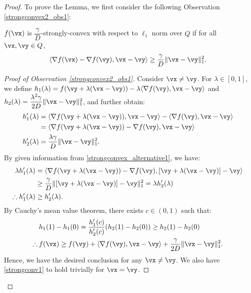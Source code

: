 \begin{proof}
    To prove the Lemma, we first consider the following
    Observation \ref{strongconvex2_obs1}:
    \begin{observation}
    \label{strongconvex2_obs1}
        $f(\vx)$ is $\dfrac{\gamma}{D}$-strongly-convex with respect to $\ell_1$ norm over $Q$ if for all $\vx,\vy \in Q$,
        \begin{align}
        \label{strongconvex_alternative1}
            \langle \nabla f(\vx) - \nabla f(\vy), \vx-\vy \rangle \geq \frac{\gamma}{D} \|\vx-\vy \|_1^2.
        \end{align}
    \end{observation}
    \begin{proof}[Proof of Observation \ref{strongconvex2_obs1}]
            Consider $\vx \neq \vy$. For $\lambda \in [0, 1]$, we define  $h_1(\lambda)= f(\vy+\lambda(\vx-\vy)) - \lambda \langle \nabla f(\vy) , \vx-\vy \rangle$ and $h_2(\lambda) = \dfrac{\lambda^2 \gamma}{2D} \|\vx-\vy \|_1^2$, and further obtain:
    \begin{align*}
        h_1'(\lambda) &=  \langle \nabla f(\vy+\lambda(\vx-\vy)) , \vx-\vy \rangle-  \langle \nabla f(\vy), \vx-\vy \rangle \\
        &= \langle \nabla f(\vy+\lambda(\vx-\vy)) - \nabla f(\vy)  , \vx-\vy \rangle \\
        h_2'(\lambda) &= \frac{\lambda \gamma}{D} \|\vx-\vy\|_1^2. 
    \end{align*} 
    By given information from \eqref{strongconvex_alternative1}, we have:
    \begin{align*}
        \lambda h_1'(\lambda)&= \langle \nabla f(\vy+\lambda(\vx-\vy)) - \nabla f(\vy)  , [\vy+\lambda (\vx-\vy)] - \vy \rangle \\
        &\geq \frac{\gamma}{D} \| [\vy+\lambda (\vx-\vy)] - \vy \|_1^2 = \lambda h_2'(\lambda)  \\
        \therefore h_1'(\lambda) &\geq h_2'(\lambda).
    \end{align*}
By Cauchy's mean value theorem, there exists $c\in (0,1)$ such that: 
\begin{align}
    &h_1(1) - h_1(0) = \frac{h_1'(c)}{h_2'(c)}
    (h_2(1) - h_2(0)) \geq h_2(1) - h_2(0)\\
    \therefore \: &f(\vx) \geq f(\vy) + \langle \nabla f(\vy), \vx-\vy \rangle + \frac{\gamma}{2D} \| \vx-\vy\|_1^2. \label{strongconv1}
\end{align}
Hence, we have the desired conclusion for any $\vx \neq \vy$. We also have \eqref{strongconv1} to hold trivially for $\vx=\vy$.

\end{proof}
\end{proof}
